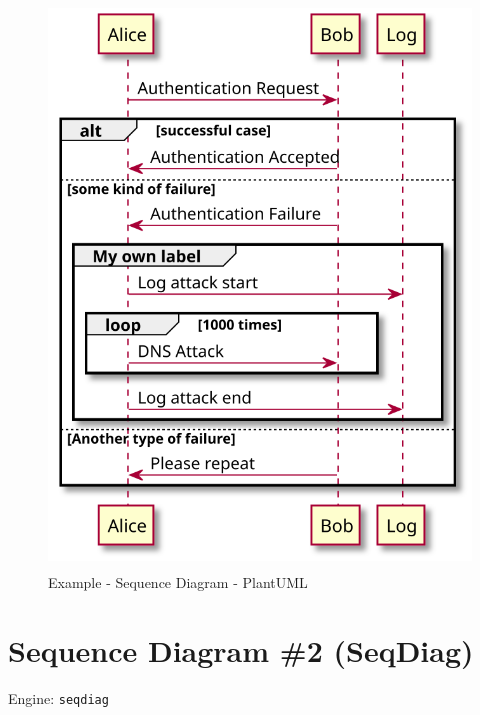 \documentclass[
  12pt,
  a4paper,
  12pt,
  oneside,
  openany]{book}
\begin{document}
\begin{figure}

{\centering \includegraphics[height=15cm]{generated/diagrams-examples-plantuml-seqdiag-Rmd} 

}

\caption{Example - Sequence Diagram - PlantUML}\label{fig:examples-pumlSequence}
\end{figure}

\newpage

\hypertarget{kroki-sequence}{%
\section{Sequence Diagram \#2 (SeqDiag)}\label{kroki-sequence}}

Engine: \texttt{seqdiag}
\end{document}
